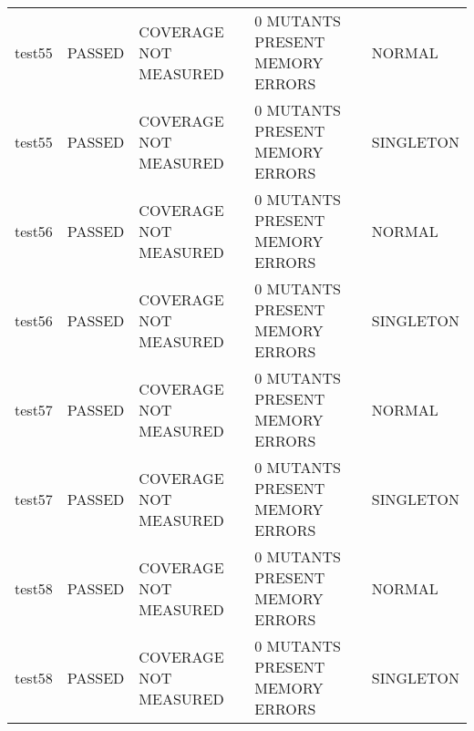 \begin{longtable}{|l|l|l|l|l|}
test55 & PASSED & COVERAGE NOT MEASURED & 0 MUTANTS PRESENT MEMORY ERRORS & NORMAL\\
test55 & PASSED & COVERAGE NOT MEASURED & 0 MUTANTS PRESENT MEMORY ERRORS & SINGLETON\\
test56 & PASSED & COVERAGE NOT MEASURED & 0 MUTANTS PRESENT MEMORY ERRORS & NORMAL\\
test56 & PASSED & COVERAGE NOT MEASURED & 0 MUTANTS PRESENT MEMORY ERRORS & SINGLETON\\
test57 & PASSED & COVERAGE NOT MEASURED & 0 MUTANTS PRESENT MEMORY ERRORS & NORMAL\\
test57 & PASSED & COVERAGE NOT MEASURED & 0 MUTANTS PRESENT MEMORY ERRORS & SINGLETON\\
test58 & PASSED & COVERAGE NOT MEASURED & 0 MUTANTS PRESENT MEMORY ERRORS & NORMAL\\
test58 & PASSED & COVERAGE NOT MEASURED & 0 MUTANTS PRESENT MEMORY ERRORS & SINGLETON\\
\hline
\end{longtable}
\normalsize
